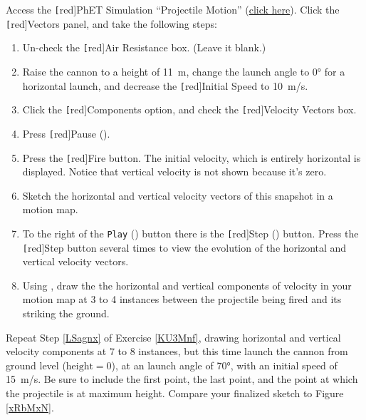 \documentclass[main-physics.tex]{subfiles}
\begin{document}
\begin{exercise} \label{KU3Mnf}
Access the \texttt[red]{PhET Simulation} ``Projectile Motion'' (\href{https://phet.colorado.edu/sims/html/projectile-motion/latest/projectile-motion_all.html}{click here}). Click the \texttt[red]{Vectors} panel, and take the following steps:

\begin{enumerate}
    \item Un-check the \texttt[red]{Air Resistance} box. (Leave it blank.)
    \item Raise the cannon to a height of \SI{11}{m}, change the launch angle to \ang{0} for a horizontal launch, and decrease the \texttt[red]{Initial Speed} to \SI{10}{m/s}.
    \item Click the \texttt[red]{Components} option, and check the \texttt[red]{Velocity Vectors} box.
    \item Press \texttt[red]{Pause} ({\small \faPause}).
    \item Press the \texttt[red]{Fire} button. The initial velocity, which is entirely horizontal is displayed. Notice that vertical velocity is not shown because it's zero.
    \item Sketch the horizontal and vertical velocity vectors of this snapshot in a motion map. 
    \item To the right of the \texttt{Play} ({\small \faPlay}) button there is the \texttt[red]{Step} ({\small \mystep}) button. Press the \texttt[red]{Step} button several times to view the evolution of the horizontal and vertical velocity vectors. 
    \item \label{LSagnx} Using {\small \mystep}, draw the the horizontal and vertical components of velocity in your motion map at 3 to 4 instances between the projectile being fired and its striking the ground.
\end{enumerate}
\end{exercise}

\begin{exercise}
    Repeat Step \ref{LSagnx} of Exercise \ref{KU3Mnf}, drawing horizontal and vertical velocity components at 7 to 8 instances, but this time launch the cannon from ground level ($\text{height} = 0$), at an launch angle of \ang{70}, with an initial speed of \SI{15}{m/s}. Be sure to include the first point, the last point, and the point at which the projectile is at maximum height. Compare your finalized sketch to Figure \ref{xRbMxN}.
\end{exercise}
\end{document}
